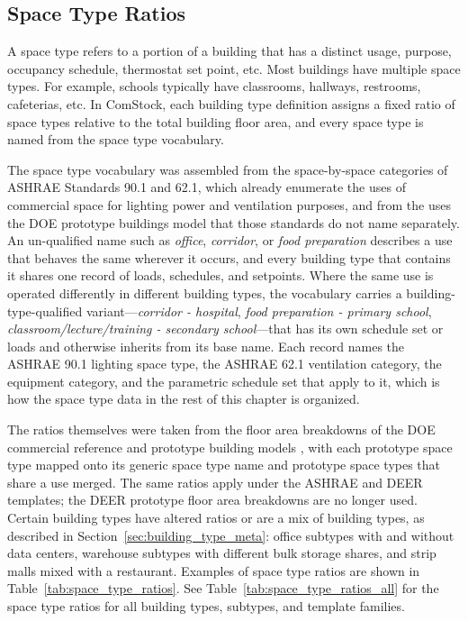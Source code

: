 \subsection{Space Type Ratios}
\label{sec:space_type_ratios}
A space type refers to a portion of a building that has a distinct usage, purpose, occupancy schedule, thermostat set point, etc. Most buildings have multiple space types. For example, schools typically have classrooms, hallways, restrooms, cafeterias, etc. In ComStock, each building type definition assigns a fixed ratio of space types relative to the total building floor area, and every space type is named from the space type vocabulary.

The space type vocabulary was assembled from the space-by-space categories of ASHRAE Standards 90.1 and 62.1, which already enumerate the uses of commercial space for lighting power and ventilation purposes, and from the uses the DOE prototype buildings model that those standards do not name separately. An un-qualified name such as \emph{office}, \emph{corridor}, or \emph{food preparation} describes a use that behaves the same wherever it occurs, and every building type that contains it shares one record of loads, schedules, and setpoints. Where the same use is operated differently in different building types, the vocabulary carries a building-type-qualified variant---\emph{corridor - hospital}, \emph{food preparation - primary school}, \emph{classroom/lecture/training - secondary school}---that has its own schedule set or loads and otherwise inherits from its base name. Each record names the ASHRAE 90.1 lighting space type, the ASHRAE 62.1 ventilation category, the equipment category, and the parametric schedule set that apply to it, which is how the space type data in the rest of this chapter is organized.

The ratios themselves were taken from the floor area breakdowns of the DOE commercial reference and prototype building models \citep{deru_2011}, with each prototype space type mapped onto its generic space type name and prototype space types that share a use merged. The same ratios apply under the ASHRAE and DEER templates; the DEER prototype floor area breakdowns are no longer used. Certain building types have altered ratios or are a mix of building types, as described in Section~\ref{sec:building_type_meta}: office subtypes with and without data centers, warehouse subtypes with different bulk storage shares, and strip malls mixed with a restaurant. Examples of space type ratios are shown in Table~\ref{tab:space_type_ratios}. See Table~\ref{tab:space_type_ratios_all} for the space type ratios for all building types, subtypes, and template families.

